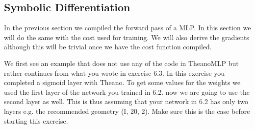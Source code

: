 \subsection{Symbolic Differentiation}
In the previous section we compiled the forward pass of a MLP. In this section
we will do the same with the cost used for training. We will also derive the
gradients although this will be trivial once we have the cost function compiled.     
\begin{exercise}
We first see an example that does not use any of the code in TheanoMLP but
rather continues from what you wrote in exercise 6.3. In this exercise you
completed a sigmoid layer with Theano. To get some values for the weights we
used the first layer of the network you trained in 6.2. now we are going to use
the second layer as well. This is thus assuming that your network in 6.2 has
only two layers e.g. the recommended geometry (I, 20, 2). Make sure this is the
case before starting this exercise.  


\end{exercise}
